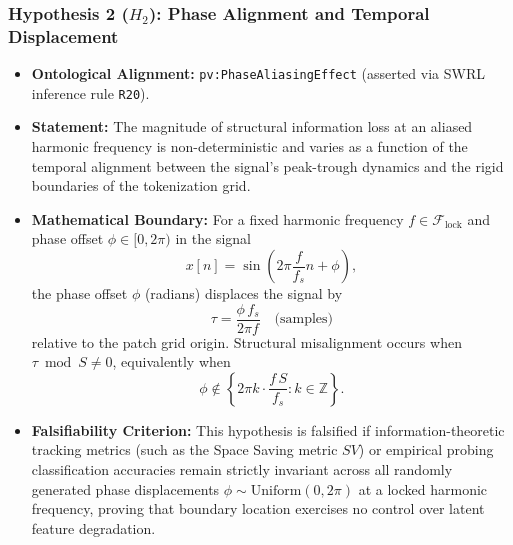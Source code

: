 \subsubsection{Hypothesis 2 ($H_2$): Phase Alignment and Temporal Displacement}
\begin{itemize}
    \item \textbf{Ontological Alignment:} \texttt{pv:PhaseAliasingEffect} (asserted via SWRL inference rule \texttt{R20}).
    \item \textbf{Statement:} The magnitude of structural information loss at an aliased harmonic frequency is non-deterministic and varies as a function of the temporal alignment between the signal's peak-trough dynamics and the rigid boundaries of the tokenization grid.
    \item \textbf{Mathematical Boundary:}
    For a fixed harmonic frequency $f \in \mathcal{F}_{\text{lock}}$ and phase offset $\phi\in[0,2\pi)$ in the signal
    \begin{equation}
    x[n] = \sin\left(2\pi \frac{f}{f_s} n + \phi\right),
    \end{equation}
    {\color{red}the phase offset $\phi$ (radians) displaces the signal by
    \begin{equation}
    \tau = \frac{\phi\, f_s}{2\pi f} \quad \text{(samples)}
    \end{equation}
    relative to the patch grid origin.
    Structural misalignment occurs when $\tau \bmod S \neq 0$, equivalently when
    \begin{equation}
    \phi \notin \left\{2\pi k \cdot \frac{f\,S}{f_s} : k \in \mathbb{Z}\right\}.
    \end{equation}}
    \item \textbf{Falsifiability Criterion:} This hypothesis is falsified if information-theoretic tracking metrics (such as the Space Saving metric $SV$) or empirical probing classification accuracies remain strictly invariant across all randomly generated phase displacements $\phi \sim \text{Uniform}(0, 2\pi)$ at a locked harmonic frequency, proving that boundary location exercises no control over latent feature degradation.
\end{itemize}

